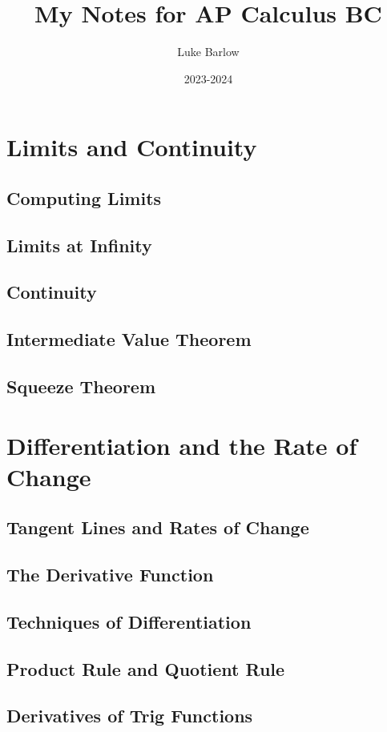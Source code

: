 \documentclass[letterpaper]{report}
\title{My Notes for AP Calculus BC}
\author{Luke Barlow}
\date{2023-2024}
\begin{document}
\maketitle
\tableofcontents

\chapter{Limits and Continuity}
\section{Computing Limits}
\section{Limits at Infinity}
\section{Continuity}
\section{Intermediate Value Theorem}
\section{Squeeze Theorem}

\chapter{Differentiation and the Rate of Change}
\section{Tangent Lines and Rates of Change}
\section{The Derivative Function}
\section{Techniques of Differentiation}
\section{Product Rule and Quotient Rule}
\section{Derivatives of Trig Functions}
\end{document}
